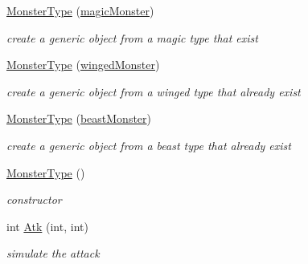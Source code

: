 \begin{DoxyCompactItemize}
\hyperlink{classMonsterType_a655e5c1081f7daa517d8e0aaf1d56170}{Monster\+Type} (\hyperlink{classmagicMonster}{magic\+Monster})
\begin{DoxyCompactList}\small\item\em create a generic object from a magic type that exist \end{DoxyCompactList}\item 
\hyperlink{classMonsterType_a4e2c679a44743f6ec9d97ee3aef1f94b}{Monster\+Type} (\hyperlink{classwingedMonster}{winged\+Monster})
\begin{DoxyCompactList}\small\item\em create a generic object from a winged type that already exist \end{DoxyCompactList}\item 
\hyperlink{classMonsterType_a6b1626d0e85e963d533599a13c2ad8a8}{Monster\+Type} (\hyperlink{classbeastMonster}{beast\+Monster})
\begin{DoxyCompactList}\small\item\em create a generic object from a beast type that already exist \end{DoxyCompactList}\item 
\hyperlink{classMonsterType_a03ce4c40938df7bdc432c2d067ee3eca}{Monster\+Type} ()
\begin{DoxyCompactList}\small\item\em constructor \end{DoxyCompactList}\item 
int \hyperlink{classMonsterType_aacd9530e1ed688a4c11f3e590594854f}{Atk} (int, int)
\begin{DoxyCompactList}\small\item\em simulate the attack \end{DoxyCompactList}\end{DoxyCompactItemize}
